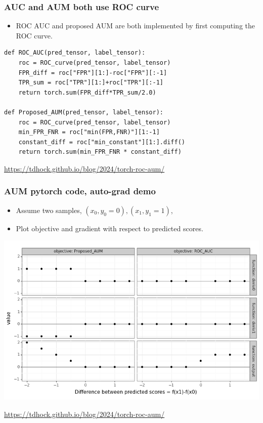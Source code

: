 \documentclass[t]{beamer}
\begin{document}
\begin{frame}[fragile]
  \frametitle{AUC and AUM both use ROC curve}

  \begin{itemize}
  \item ROC AUC and proposed AUM are both implemented by first
    computing the ROC curve.
  \end{itemize}
  \begin{verbatim}
def ROC_AUC(pred_tensor, label_tensor):
    roc = ROC_curve(pred_tensor, label_tensor)
    FPR_diff = roc["FPR"][1:]-roc["FPR"][:-1]
    TPR_sum = roc["TPR"][1:]+roc["TPR"][:-1]
    return torch.sum(FPR_diff*TPR_sum/2.0)

def Proposed_AUM(pred_tensor, label_tensor):
    roc = ROC_curve(pred_tensor, label_tensor)
    min_FPR_FNR = roc["min(FPR,FNR)"][1:-1]
    constant_diff = roc["min_constant"][1:].diff()
    return torch.sum(min_FPR_FNR * constant_diff)
\end{verbatim}

  \url{https://tdhock.github.io/blog/2024/torch-roc-aum/}
\end{frame}

\begin{frame}[fragile]
  \frametitle{AUM pytorch code, auto-grad demo}

  \begin{itemize}
  \item Assume two samples, $(x_0,y_0=0), (x_1,y_1=1)$,
  \item Plot objective and gradient with respect to predicted scores.
  \end{itemize}

  \includegraphics[width=\textwidth]{gg_aum_grad}

  \url{https://tdhock.github.io/blog/2024/torch-roc-aum/}
\end{frame}
\end{document}

